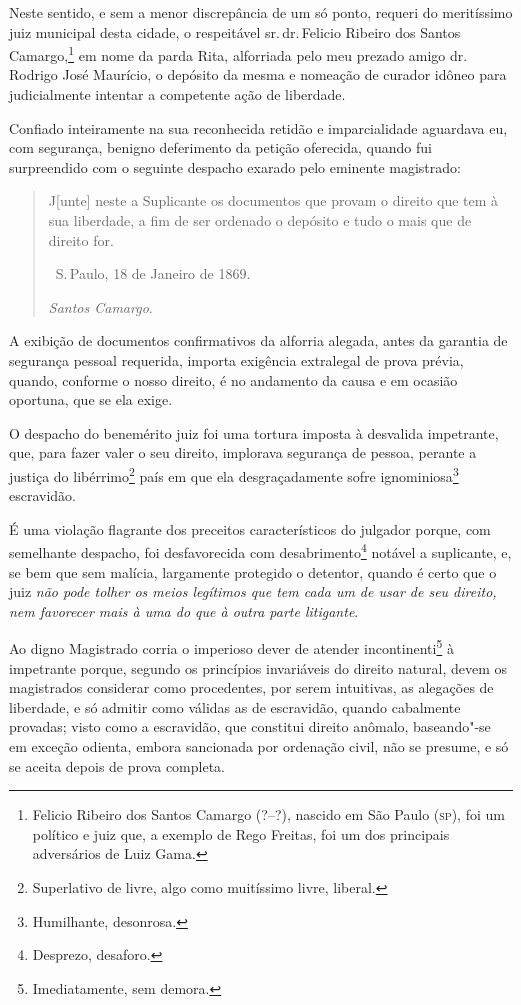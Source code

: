 Neste sentido, e sem a menor discrepância de um só ponto, requeri do
meritíssimo juiz municipal desta cidade, o respeitável sr.\,dr.\,Felicio
Ribeiro dos Santos Camargo,\footnote{Felicio Ribeiro dos Santos Camargo
  (?--?), nascido em São Paulo (\textsc{sp}), foi um político e juiz que, a
  exemplo de Rego Freitas, foi um dos principais adversários de Luiz
  Gama.} em nome da parda Rita, alforriada pelo meu prezado amigo dr.\,Rodrigo José Maurício, o depósito da mesma e nomeação de curador idôneo
para judicialmente intentar a competente ação de liberdade.

Confiado inteiramente na sua reconhecida retidão e imparcialidade
aguardava eu, com segurança, benigno deferimento da petição oferecida,
quando fui surpreendido com o seguinte despacho exarado pelo eminente
magistrado:

\begin{quote}
J{[}unte{]} neste a Suplicante os documentos que provam o direito que
tem à sua liberdade, a fim de ser ordenado o depósito e tudo o mais que
de direito for.

\hfill\ S.\,Paulo, 18 de Janeiro de 1869.

\hfill\emph{Santos Camargo}.
\end{quote}

A exibição de documentos confirmativos da alforria alegada, antes da
garantia de segurança pessoal requerida, importa exigência extralegal de
prova prévia, quando, conforme o nosso direito, é no andamento da causa
e em ocasião oportuna, que se ela exige.

O despacho do benemérito juiz foi uma tortura imposta à desvalida
impetrante, que, para fazer valer o seu direito, implorava segurança de
pessoa, perante a justiça do libérrimo\footnote{Superlativo de livre, \label{liberrimo}
  algo como muitíssimo livre, liberal.} país em que ela
desgraçadamente sofre ignominiosa\footnote{Humilhante, desonrosa.}
escravidão.

É uma violação flagrante dos preceitos característicos do julgador
porque, com semelhante despacho, foi desfavorecida com
desabrimento\footnote{Desprezo, desaforo.} notável a suplicante, e, se
bem que sem malícia, largamente protegido o detentor, quando é certo que
o juiz \emph{não pode tolher os meios legítimos que tem cada um de usar
de seu direito, nem favorecer mais à uma do que à outra parte
litigante}.

Ao digno Magistrado corria o imperioso dever de atender
incontinenti\footnote{Imediatamente, sem demora.} à impetrante porque,
segundo os princípios invariáveis do direito natural, devem os
magistrados considerar como procedentes, por serem intuitivas, as
alegações de liberdade, e só admitir como válidas as de escravidão,
quando cabalmente provadas; visto como a escravidão, que constitui
direito anômalo, baseando"-se em exceção odienta, embora sancionada por
ordenação civil, não se presume, e só se aceita depois de prova
completa.


